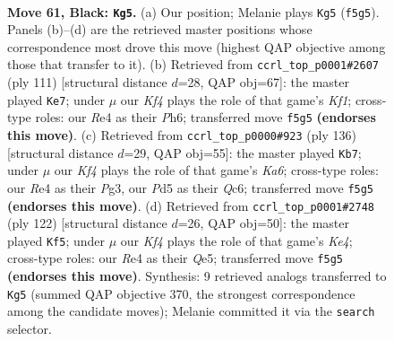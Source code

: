 \documentclass[11pt]{article}
\begin{document}
\clearpage

\begin{figure}[p]\centering
\begin{subfigure}{0.46\textwidth}\centering
\resizebox{\linewidth}{!}{%
\newchessgame
\chessboard[
  setfen={2Q5/8/5p2/3p1k2/4r3/6PK/q6P/8 b - - 3 61},
  showmover=false,
  pgfstyle=straightmove, color=movearrow, markmove={f5-g5}
]}
\caption{}
\end{subfigure}\hfill
\begin{subfigure}{0.46\textwidth}\centering
\resizebox{\linewidth}{!}{%
\newchessgame
\chessboard[
  setfen={2Q2k2/6p1/7p/8/5P2/q6P/6PK/8 b - - 5 56},
  showmover=false,
  pgfstyle=straightmove, color=movearrow, markmove={f8-e7}
]}
\caption{}
\end{subfigure}
\\[4pt]
\begin{subfigure}{0.46\textwidth}\centering
\resizebox{\linewidth}{!}{%
\newchessgame
\chessboard[
  setfen={7k/6p1/K1Q4p/P7/8/6P1/4q2P/8 w - - 25 69},
  showmover=false,
  pgfstyle=straightmove, color=movearrow, markmove={a6-b7}
]}
\caption{}
\end{subfigure}\hfill
\begin{subfigure}{0.46\textwidth}\centering
\resizebox{\linewidth}{!}{%
\newchessgame
\chessboard[
  setfen={8/6pk/7p/4Q3/2q1K3/4P1P1/8/8 w - - 4 62},
  showmover=false,
  pgfstyle=straightmove, color=movearrow, markmove={e4-f5}
]}
\caption{}
\end{subfigure}
\caption{\textbf{Move 61, Black: \texttt{Kg5}.} (a) Our position; Melanie plays \texttt{Kg5} (\texttt{f5g5}). Panels (b)--(d) are the retrieved master positions whose correspondence most drove this move (highest QAP objective among those that transfer to it). (b) Retrieved from \texttt{ccrl\_top\_p0001\#2607} (ply 111) [structural distance $d$=28, QAP obj=67]: the master played \texttt{Ke7}; under $\mu$ our \emph{Kf4} plays the role of that game's \emph{Kf1}; cross-type roles: our \emph{R}e4 as their \emph{P}h6; transferred move \texttt{f5g5} \textbf{(endorses this move)}. (c) Retrieved from \texttt{ccrl\_top\_p0000\#923} (ply 136) [structural distance $d$=29, QAP obj=55]: the master played \texttt{Kb7}; under $\mu$ our \emph{Kf4} plays the role of that game's \emph{Ka6}; cross-type roles: our \emph{R}e4 as their \emph{P}g3, our \emph{P}d5 as their \emph{Q}c6; transferred move \texttt{f5g5} \textbf{(endorses this move)}. (d) Retrieved from \texttt{ccrl\_top\_p0001\#2748} (ply 122) [structural distance $d$=26, QAP obj=50]: the master played \texttt{Kf5}; under $\mu$ our \emph{Kf4} plays the role of that game's \emph{Ke4}; cross-type roles: our \emph{R}e4 as their \emph{Q}e5; transferred move \texttt{f5g5} \textbf{(endorses this move)}. Synthesis: 9 retrieved analogs transferred to \texttt{Kg5} (summed QAP objective 370, the strongest correspondence among the candidate moves); Melanie committed it via the \texttt{search} selector.}
\label{fig:thought-m121}
\end{figure}
\end{document}
